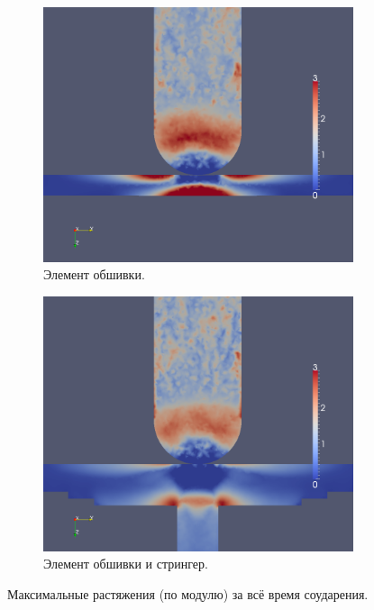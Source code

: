 \begin{figure}[h]
\begin{subfigure}[b]{0.5\textwidth}
\centering
\includegraphics[width=\textwidth]{png/pkm-experiment/wing-only/tension.png}
\caption{Элемент обшивки.}
\end{subfigure}
\begin{subfigure}[b]{0.5\textwidth}
\centering
\includegraphics[width=\textwidth]{png/pkm-experiment/wing-stringer/tension.png}
\caption{Элемент обшивки и стрингер.}
\end{subfigure}
\caption{Максимальные растяжения (по модулю) за всё время соударения.}
\label{pic:pkm_experiment_tension}
\end{figure}

